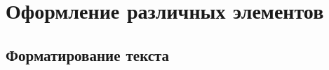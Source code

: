 \documentclass[a4paper,14pt,oneside,openany]{memoir}
\begin{document}






%
%



%
%








\chapter{Оформление различных элементов} \label{chapt1}

\section{Форматирование текста} \label{sect1_1}

\end{document}
